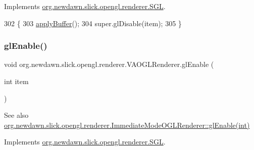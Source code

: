 Implements \mbox{\hyperlink{interfaceorg_1_1newdawn_1_1slick_1_1opengl_1_1renderer_1_1_s_g_l_a3b47b402f84bc1404e6b218264981bb5}{org.\+newdawn.\+slick.\+opengl.\+renderer.\+S\+GL}}.


\begin{DoxyCode}
302                                     \{
303         \mbox{\hyperlink{classorg_1_1newdawn_1_1slick_1_1opengl_1_1renderer_1_1_v_a_o_g_l_renderer_a7c5d09419cd40761be8f849631aebab5}{applyBuffer}}();
304         super.glDisable(item);
305     \}
\end{DoxyCode}
\mbox{\label{classorg_1_1newdawn_1_1slick_1_1opengl_1_1renderer_1_1_v_a_o_g_l_renderer_a9da29b057439f8fdaffabe989241b3bd}} 
\subsubsection{\texorpdfstring{gl\+Enable()}{glEnable()}}
{\footnotesize\ttfamily void org.\+newdawn.\+slick.\+opengl.\+renderer.\+V\+A\+O\+G\+L\+Renderer.\+gl\+Enable (\begin{DoxyParamCaption}\item[{int}]{item }\end{DoxyParamCaption})\hspace{0.3cm}{\ttfamily [inline]}}

\begin{DoxySeeAlso}{See also}
\mbox{\hyperlink{classorg_1_1newdawn_1_1slick_1_1opengl_1_1renderer_1_1_immediate_mode_o_g_l_renderer_ac8ffe84c76858531fd8c872bef726bb9}{org.\+newdawn.\+slick.\+opengl.\+renderer.\+Immediate\+Mode\+O\+G\+L\+Renderer\+::gl\+Enable(int)}} 
\end{DoxySeeAlso}


Implements \mbox{\hyperlink{interfaceorg_1_1newdawn_1_1slick_1_1opengl_1_1renderer_1_1_s_g_l_a35991f93081980b303d6ccc5bd88c8da}{org.\+newdawn.\+slick.\+opengl.\+renderer.\+S\+GL}}.


